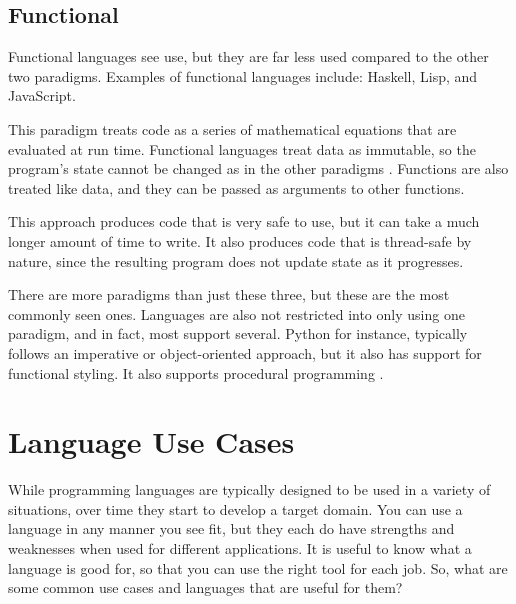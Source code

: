 \documentclass[12pt, oneside, a4paper]{book}
\begin{document}
         \subsection{Functional}
         Functional languages see use, but they are far less used compared to the other two paradigms.
         Examples of functional languages include: Haskell, Lisp, and JavaScript\footnotemark.

         This paradigm treats code as a series of mathematical equations that are evaluated at run time.
         Functional languages treat data as immutable, so the program's state cannot be changed as in the other paradigms \autocite{normarkOverviewFourMain}.
         Functions are also treated like data, and they can be passed as arguments to other functions.

         This approach produces code that is very safe to use, but it can take a much longer amount of time to write.
         It also produces code that is thread-safe by nature, since the resulting program does not update state as it progresses.


         There are more paradigms than just these three, but these are the most commonly seen ones.
         Languages are also not restricted into only using one paradigm, and in fact, most support several.
         Python for instance, typically follows an imperative or object-oriented approach, but it also has support for functional styling.
         It also supports procedural programming \autocite{GeneralPythonFAQ}.

      \section{Language Use Cases}
         While programming languages are typically designed to be used in a variety of situations, over time they start to develop a target domain.
         You can use a language in any manner you see fit, but they each do have strengths and weaknesses when used for different applications.
         It is useful to know what a language is good for, so that you can use the right tool for each job.
         So, what are some common use cases and languages that are useful for them?
\end{document}
